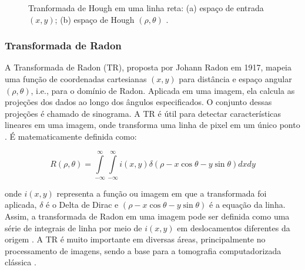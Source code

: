 \documentclass[12pt, a4paper, english, brazil]{article}
\begin{document}
\begin{figure}[ht]
    \centering
    \caption{Tranformada de Hough em uma linha reta: (a) espaço de entrada $(x, y)$; (b) espaço de Hough $(\rho, \theta)$ \cite{Lin_Otobe_2001}.}
    \label{fig:tHough}
\end{figure}

\subsubsection{Transformada de Radon}

A Transformada de Radon (TR), proposta por Johann Radon em 1917, mapeia uma função de coordenadas cartesianas $(x, y)$ para distância e espaço angular $(\rho, \theta)$, i.e., para o domínio de Radon. Aplicada em uma imagem, ela calcula as projeções dos dados ao longo dos ângulos especificados. O conjunto dessas projeções é chamado de sinograma. A TR é útil para detectar características lineares em uma imagem, onde transforma uma linha de pixel em um único ponto \cite{Kaur_Sahambi_2015}. É matematicamente definida como:

\begin{equation}
R(\rho, \theta) = \int\limits _{-\infty}^\infty \int\limits _{-\infty}^\infty i (x, y) \delta (\rho - x\cos \theta - y\sin \theta ) dxdy
\end{equation}

onde $i (x, y)$ representa a função ou imagem em que a transformada foi aplicada, $\delta$ é o Delta de Dirac e $(\rho - x\cos \theta - y\sin \theta)$ é a equação da linha. Assim, a transformada de Radon em uma imagem pode ser definida como uma série de integrais de linha por meio de $i (x, y)$ em deslocamentos diferentes da origem \cite{Li_2019}. A TR é muito importante em diversas áreas, principalmente no processamento de imagens, sendo a base para a tomografia computadorizada clássica \cite{Silva_Escarpinati_Backes_2021}.
\end{document}
